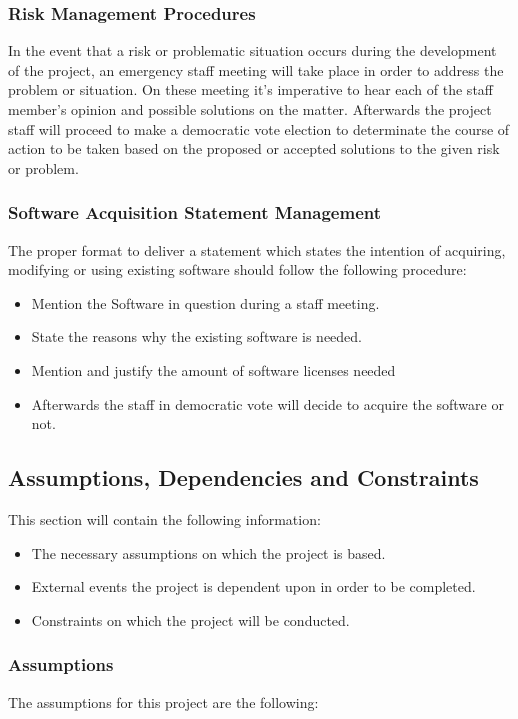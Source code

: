 \documentclass[12pt]{article}
\begin{document}
\subsubsection{Risk Management Procedures}
In the event that a risk or problematic situation occurs during the development of the project, an emergency staff meeting will take place in order to address the problem or situation. On these meeting it’s imperative to hear each of the staff member’s opinion and possible solutions on the matter. Afterwards the project staff will proceed to make a democratic vote election to determinate the course of action to be taken based on the proposed or accepted solutions to the given risk or problem.

\subsubsection{Software Acquisition Statement Management}
The proper format to deliver a statement which states the intention of acquiring, modifying or using existing software should follow the following procedure:

\begin{itemize}
  \item	Mention the Software in question during a staff meeting.
  \item State the reasons why the existing software is needed.
  \item Mention and justify the amount of software licenses needed
  \item Afterwards the staff in democratic vote will decide to acquire the software or not.
\end{itemize}

\subsection{Assumptions, Dependencies and Constraints}
This section will contain the following information:
 
 \begin{itemize}
   \item The necessary assumptions on which the project is based.
   \item External events the project is dependent upon in order to be completed.
   \item Constraints on which the project will be conducted.
 \end{itemize}

\subsubsection{Assumptions}
The assumptions for this project are the following:
\end{document}
